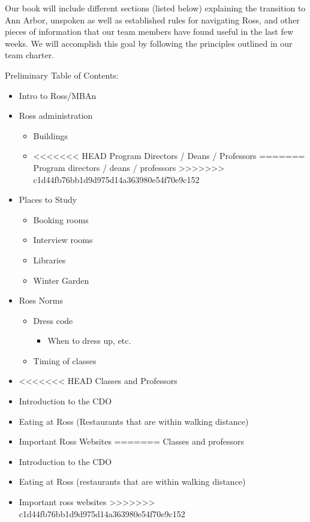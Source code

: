 \documentclass[
]{book}
\providecommand{\tightlist}{%
  \setlength{\itemsep}{0pt}\setlength{\parskip}{0pt}}
\begin{document}
Our book will include different sections (listed below) explaining the transition to Ann Arbor, unspoken as well as established rules for navigating Ross, and other pieces of information that our team members have found useful in the last few weeks. We will accomplish this goal by following the principles outlined in our team charter.

Preliminary Table of Contents:

\begin{itemize}
\tightlist
\item
  Intro to Ross/MBAn
\item
  Ross administration

  \begin{itemize}
  \tightlist
  \item
    Buildings
  \item
<<<<<<< HEAD
    Program Directors / Deans / Professors
=======
    Program directors / deans / professors
>>>>>>> c1d44fb76bb1d9d975d14a363980e54f70e9c152
  \end{itemize}
\item
  Places to Study

  \begin{itemize}
  \tightlist
  \item
    Booking rooms
  \item
    Interview rooms
  \item
    Libraries
  \item
    Winter Garden
  \end{itemize}
\item
  Ross Norms

  \begin{itemize}
  \tightlist
  \item
    Dress code

    \begin{itemize}
    \tightlist
    \item
      When to dress up, etc.
    \end{itemize}
  \item
    Timing of classes
  \end{itemize}
\item
<<<<<<< HEAD
  Classes and Professors
\item
  Introduction to the CDO
\item
  Eating at Ross (Restaurants that are within walking distance)
\item
  Important Ross Websites
=======
  Classes and professors
\item
  Introduction to the CDO
\item
  Eating at Ross (restaurants that are within walking distance)
\item
  Important ross websites
>>>>>>> c1d44fb76bb1d9d975d14a363980e54f70e9c152


\end{itemize}
\end{document}
